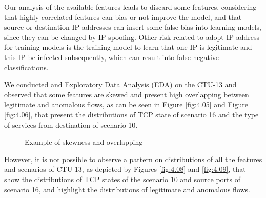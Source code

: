 \documentclass[review]{elsarticle}
\begin{document}
Our analysis of the available features leads to discard some features, considering that highly correlated features can bias or not improve the model, and that source or destination IP addresses can insert some false bias into learning models, since they can be changed by IP spoofing. Other risk related to adopt IP address for training models is the training model to learn that
one IP is legitimate and this IP be infected subsequently, which can result into false negative classifications.

We conducted and Exploratory Data Analysis (EDA) on the CTU-13 and observed that some features are skewed and present high overlapping between legitimate and anomalous flows, as can be seen in Figure \ref{fig:4.05} and Figure \ref{fig:4.06}, that present the distributions of TCP state of scenario 16 and the type of services from destination of scenario 10.

\begin{figure}[!htb]
	\centering
	\caption[Skewness and Overlapping]{Example of skewness and overlapping}
	\label{fig:4.07}
\end{figure}

However, it is not possible to observe a pattern on distributions of all the features and scenarios of CTU-13, as depicted by Figures \ref{fig:4.08} and \ref{fig:4.09}, that show the distributions of TCP states of the scenario 10 and source ports of scenario 16, and highlight the distributions of legitimate and anomalous flows.
\end{document}
